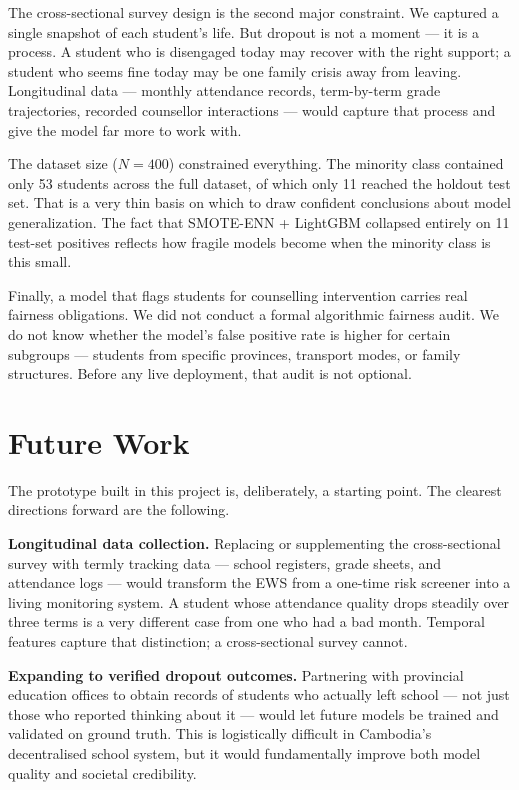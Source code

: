 The cross-sectional survey design is the second major constraint. We captured a single snapshot of each student's life. But dropout is not a moment --- it is a process. A student who is disengaged today may recover with the right support; a student who seems fine today may be one family crisis away from leaving. Longitudinal data --- monthly attendance records, term-by-term grade trajectories, recorded counsellor interactions --- would capture that process and give the model far more to work with.

The dataset size ($N = 400$) constrained everything. The minority class contained only 53 students across the full dataset, of which only 11 reached the holdout test set. That is a very thin basis on which to draw confident conclusions about model generalization. The fact that SMOTE-ENN + LightGBM collapsed entirely on 11 test-set positives reflects how fragile models become when the minority class is this small.

Finally, a model that flags students for counselling intervention carries real fairness obligations. We did not conduct a formal algorithmic fairness audit. We do not know whether the model's false positive rate is higher for certain subgroups --- students from specific provinces, transport modes, or family structures. Before any live deployment, that audit is not optional.

\section{Future Work}
\label{sec:future_work}

The prototype built in this project is, deliberately, a starting point. The clearest directions forward are the following.

\textbf{Longitudinal data collection.} Replacing or supplementing the cross-sectional survey with termly tracking data --- school registers, grade sheets, and attendance logs --- would transform the EWS from a one-time risk screener into a living monitoring system. A student whose attendance quality drops steadily over three terms is a very different case from one who had a bad month. Temporal features capture that distinction; a cross-sectional survey cannot.

\textbf{Expanding to verified dropout outcomes.} Partnering with provincial education offices to obtain records of students who actually left school --- not just those who reported thinking about it --- would let future models be trained and validated on ground truth. This is logistically difficult in Cambodia's decentralised school system, but it would fundamentally improve both model quality and societal credibility.

